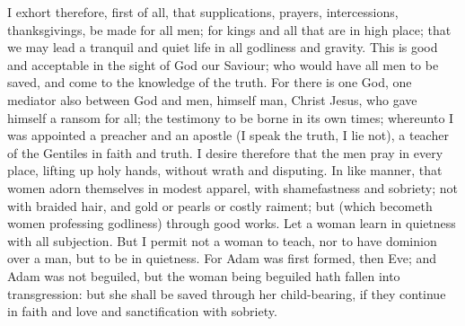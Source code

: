 I exhort therefore, first of all, that supplications, prayers, intercessions, thanksgivings, be made for all men; for kings and all that are in high place; that we may lead a tranquil and quiet life in all godliness and gravity. This is good and acceptable in the sight of God our Saviour; who would have all men to be saved, and come to the knowledge of the truth. For there is one God, one mediator also between God and men, himself man, Christ Jesus, who gave himself a ransom for all; the testimony to be borne in its own times; whereunto I was appointed a preacher and an apostle (I speak the truth, I lie not), a teacher of the Gentiles in faith and truth.  I desire therefore that the men pray in every place, lifting up holy hands, without wrath and disputing. In like manner, that women adorn themselves in modest apparel, with shamefastness and sobriety; not with braided hair, and gold or pearls or costly raiment; but (which becometh women professing godliness) through good works. Let a woman learn in quietness with all subjection. But I permit not a woman to teach, nor to have dominion over a man, but to be in quietness. For Adam was first formed, then Eve; and Adam was not beguiled, but the woman being beguiled hath fallen into transgression: but she shall be saved through her child-bearing, if they continue in faith and love and sanctification with sobriety. 

